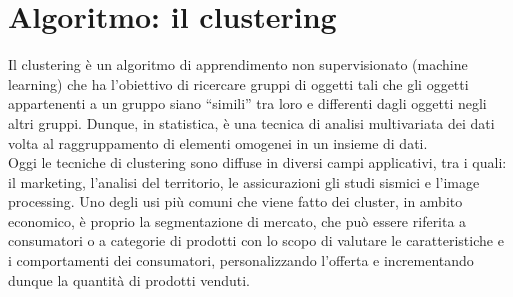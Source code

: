 \documentclass[10pt,a4paper]{report}
\begin{document}
	\section{Algoritmo: il clustering}
	Il clustering è un algoritmo di apprendimento non supervisionato (machine learning) che ha l'obiettivo di ricercare gruppi di oggetti tali che  
	gli oggetti appartenenti a un gruppo siano “simili” tra loro e differenti dagli oggetti negli altri gruppi. Dunque, in statistica, è una tecnica di 
        analisi multivariata dei dati volta al raggruppamento di elementi omogenei in un insieme di dati.\\
        Oggi le tecniche di clustering sono diffuse in diversi campi applicativi, tra i quali: il marketing, l'analisi del territorio, le assicurazioni  gli studi sismici e l'image processing.  Uno degli usi più comuni che viene fatto dei cluster, in ambito economico, 
        è proprio la segmentazione di mercato, che può essere riferita a consumatori o a categorie di prodotti con lo scopo di valutare le caratteristiche e i comportamenti dei consumatori, personalizzando l’offerta
        e incrementando dunque la quantità di prodotti venduti.
        
\end{document}
